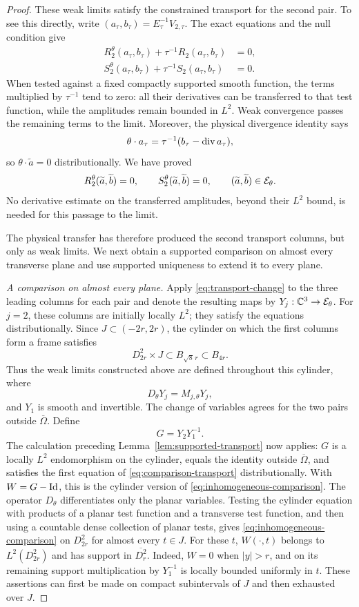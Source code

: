 \begin{proof}
These weak limits satisfy the constrained transport for the second
pair. To see this directly, write
$(a_\tau,b_\tau)=E_\tau^{-1}V_{2,\tau}$. The exact equations and
the null condition give
\[
 \begin{aligned}
 R_2^\theta(a_\tau,b_\tau)
       +\tau^{-1}R_2(a_\tau,b_\tau)&=0,\\
 S_2^\theta(a_\tau,b_\tau)
       +\tau^{-1}S_2(a_\tau,b_\tau)&=0.
 \end{aligned}
\]
When tested against a fixed compactly supported smooth function,
the terms multiplied by $\tau^{-1}$ tend to zero: all their
derivatives can be transferred to that test function, while the
amplitudes remain bounded in $L^2$. Weak convergence passes the
remaining terms to the limit. Moreover, the physical divergence
identity says
\[
 \theta\cdot a_\tau
   =\tau^{-1}(b_\tau-\operatorname{div} a_\tau),
\]
so $\theta\cdot\widetilde a=0$ distributionally. We have proved
\[
 R_2^\theta(\widetilde a,\widetilde b)=0,
 \qquad S_2^\theta(\widetilde a,\widetilde b)=0,
 \qquad (\widetilde a,\widetilde b)\in\mathcal E_\theta.
\]
No derivative estimate on the transferred amplitudes, beyond their
$L^2$ bound, is needed for this passage to the limit.

The physical transfer has therefore produced the second transport
columns, but only as weak limits. We next obtain a supported comparison
on almost every transverse plane and use supported uniqueness to extend
it to every plane.

\emph{A comparison on almost every plane.}
Apply \eqref{eq:transport-change} to the three leading columns for
each pair and denote the resulting maps by
$Y_j:\mathbb C^3\to\mathcal E_\theta$. For $j=2$, these columns are initially
locally $L^2$; they satisfy the equations distributionally. Since
$J\subset(-2r,2r)$, the cylinder on which the first columns form a frame
satisfies
\[
 D_{2r}^2\times J\subset B_{\sqrt8\,r}\subset B_{4r}.
\]
Thus the weak limits constructed above are defined throughout this
cylinder, where
\[
 D_\theta Y_j=M_{j,\theta}Y_j,
\]
and $Y_1$ is smooth and invertible. The change of variables agrees
for the two pairs outside $\overline\Omega$. Define
\[
 G=Y_2Y_1^{-1}.
\]
The calculation preceding Lemma~\ref{lem:supported-transport} now applies:
$G$ is a locally $L^2$ endomorphism on the cylinder, equals the identity
outside $\overline\Omega$, and satisfies the first equation of
\eqref{eq:comparison-transport} distributionally. With $W=G-\mathrm{Id}$, this
is the cylinder version of \eqref{eq:inhomogeneous-comparison}.
The operator $D_\theta$ differentiates only the planar variables.
Testing the cylinder equation with products of a planar test
function and a transverse test function, and then using a countable
dense collection of planar tests, gives
\eqref{eq:inhomogeneous-comparison} on $D_{2r}^2$ for almost every
$t\in J$. For these $t$, $W(\cdot,t)$ belongs to $L^2(D_{2r}^2)$
and has support in $\overline{D_r^2}$. Indeed, $W=0$ when $|y|>r$,
and on its remaining support multiplication by $Y_1^{-1}$ is locally
bounded uniformly in $t$. These assertions can first be made on
compact subintervals of $J$ and then exhausted over $J$.


\end{proof}
